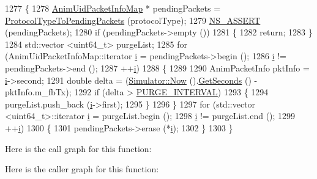 \begin{DoxyCode}
1277 \{
1278   \hyperlink{classns3_1_1AnimationInterface_afea577896009c4134df836bc20f1eabe}{AnimUidPacketInfoMap} * pendingPackets = 
      \hyperlink{classns3_1_1AnimationInterface_a3785f870e7f29eb0ea0b843327fad5bb}{ProtocolTypeToPendingPackets} (protocolType);
1279   \hyperlink{assert_8h_a6dccdb0de9b252f60088ce281c49d052}{NS\_ASSERT} (pendingPackets);
1280   \textcolor{keywordflow}{if} (pendingPackets->empty ())
1281     \{
1282       \textcolor{keywordflow}{return};
1283     \}
1284   std::vector <uint64\_t> purgeList;
1285   \textcolor{keywordflow}{for} (AnimUidPacketInfoMap::iterator \hyperlink{bernuolliDistribution_8m_a6f6ccfcf58b31cb6412107d9d5281426}{i} = pendingPackets->begin ();
1286        \hyperlink{bernuolliDistribution_8m_a6f6ccfcf58b31cb6412107d9d5281426}{i} != pendingPackets->end ();
1287        ++\hyperlink{bernuolliDistribution_8m_a6f6ccfcf58b31cb6412107d9d5281426}{i})
1288     \{
1289      
1290       AnimPacketInfo pktInfo = \hyperlink{bernuolliDistribution_8m_a6f6ccfcf58b31cb6412107d9d5281426}{i}->second; 
1291       \textcolor{keywordtype}{double} delta = (\hyperlink{classns3_1_1Simulator_ac3178fa975b419f7875e7105be122800}{Simulator::Now} ().\hyperlink{classns3_1_1Time_a8f20d5c3b0902d7b4320982f340b57c8}{GetSeconds} () - pktInfo.m\_fbTx);
1292       \textcolor{keywordflow}{if} (delta > \hyperlink{animation-interface_8h_af3477c4d63f16798ef27f5c6b0e2d96c}{PURGE\_INTERVAL})
1293         \{
1294           purgeList.push\_back (\hyperlink{bernuolliDistribution_8m_a6f6ccfcf58b31cb6412107d9d5281426}{i}->first);
1295         \}
1296     \}
1297   \textcolor{keywordflow}{for} (std::vector <uint64\_t>::iterator \hyperlink{bernuolliDistribution_8m_a6f6ccfcf58b31cb6412107d9d5281426}{i} = purgeList.begin ();
1298        \hyperlink{bernuolliDistribution_8m_a6f6ccfcf58b31cb6412107d9d5281426}{i} != purgeList.end ();
1299        ++\hyperlink{bernuolliDistribution_8m_a6f6ccfcf58b31cb6412107d9d5281426}{i})
1300     \{
1301       pendingPackets->erase (*\hyperlink{bernuolliDistribution_8m_a6f6ccfcf58b31cb6412107d9d5281426}{i});
1302     \}
1303 \}
\end{DoxyCode}


Here is the call graph for this function\+:




Here is the caller graph for this function\+:


